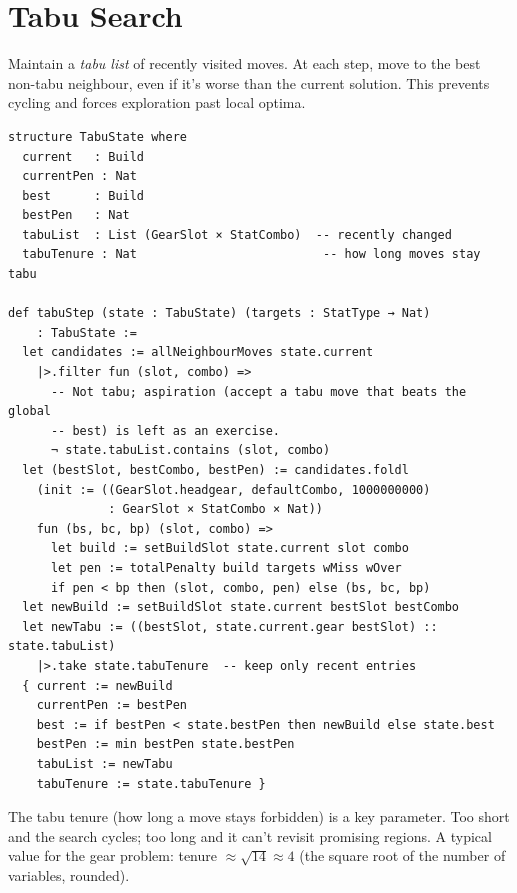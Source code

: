 \documentclass[11pt, a4paper, oneside]{book}
\begin{document}
\section{Tabu Search}

\begin{defbox}[title={Tabu Search}]
Maintain a \emph{tabu list} of recently visited moves.  At each step, move
to the best non-tabu neighbour, even if it's worse than the current solution.
This prevents cycling and forces exploration past local optima.
\end{defbox}

\begin{leanbox}[title={Lean 4 --- Tabu Search}]
\begin{verbatim}
structure TabuState where
  current   : Build
  currentPen : Nat
  best      : Build
  bestPen   : Nat
  tabuList  : List (GearSlot × StatCombo)  -- recently changed
  tabuTenure : Nat                          -- how long moves stay tabu

def tabuStep (state : TabuState) (targets : StatType → Nat)
    : TabuState :=
  let candidates := allNeighbourMoves state.current
    |>.filter fun (slot, combo) =>
      -- Not tabu; aspiration (accept a tabu move that beats the global
      -- best) is left as an exercise.
      ¬ state.tabuList.contains (slot, combo)
  let (bestSlot, bestCombo, bestPen) := candidates.foldl
    (init := ((GearSlot.headgear, defaultCombo, 1000000000)
              : GearSlot × StatCombo × Nat))
    fun (bs, bc, bp) (slot, combo) =>
      let build := setBuildSlot state.current slot combo
      let pen := totalPenalty build targets wMiss wOver
      if pen < bp then (slot, combo, pen) else (bs, bc, bp)
  let newBuild := setBuildSlot state.current bestSlot bestCombo
  let newTabu := ((bestSlot, state.current.gear bestSlot) :: state.tabuList)
    |>.take state.tabuTenure  -- keep only recent entries
  { current := newBuild
    currentPen := bestPen
    best := if bestPen < state.bestPen then newBuild else state.best
    bestPen := min bestPen state.bestPen
    tabuList := newTabu
    tabuTenure := state.tabuTenure }
\end{verbatim}
\end{leanbox}

The tabu tenure (how long a move stays forbidden) is a key parameter.  Too
short and the search cycles; too long and it can't revisit promising regions.
A typical value for the gear problem: tenure $\approx \sqrt{14} \approx 4$
(the square root of the number of variables, rounded).
\end{document}
